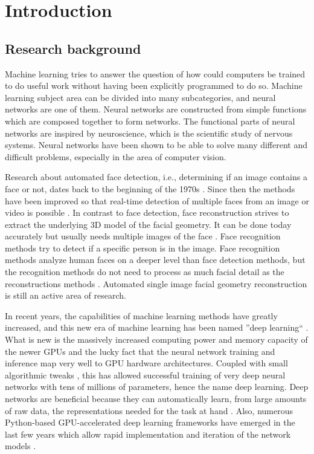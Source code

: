 \chapter{Introduction}

\section{Research background}

Machine learning tries to answer the question of how could computers be trained to do useful work without having been explicitly programmed to do so. Machine learning subject area can be divided into many subcategories, and neural networks are one of them. Neural networks are constructed from simple functions which are composed together to form networks. The functional parts of neural networks are inspired by neuroscience, which is the scientific study of nervous systems. Neural networks have been shown to be able to solve many different and difficult problems, especially in the area of computer vision. \cite{Goodfellow2016,LeCun2015}

Research about automated face detection, i.e., determining if an image contains a face or not, dates back to the beginning of the 1970s \cite{Sakai1972}. Since then the methods have been improved so that real-time detection of multiple faces from an image or video is possible \cite{Osadchy2007}. In contrast to face detection, face reconstruction strives to extract the underlying 3D model of the facial geometry. It can be done today accurately but usually needs multiple images of the face \cite{Valgaerts2012}. Face recognition methods try to detect if a specific person is in the image. Face recognition methods analyze human faces on a deeper level than face detection methods, but the recognition methods do not need to process as much facial detail as the reconstructions methods \cite{Datta2015}. Automated single image facial geometry reconstruction is still an active area of research.

In recent years, the capabilities of machine learning methods have greatly increased, and this new era of machine learning has been named ''deep learning`` \cite{Goodfellow2016}. What is new is the massively increased computing power and memory capacity of the newer \acp{GPU} and the lucky fact that the neural network training and inference map very well to \ac{GPU} hardware architectures. Coupled with small algorithmic tweaks \cite{Goodfellow2016}, this has allowed successful training of very deep neural networks with tens of millions of parameters, hence the name deep learning. Deep networks are beneficial because they can automatically learn, from large amounts of raw data, the representations needed for the task at hand \cite{LeCun2015}. Also, numerous Python-based \ac{GPU}-accelerated deep learning frameworks have emerged in the last few years which allow rapid implementation and iteration of the network models \cite{tensorflow,cntk}.

